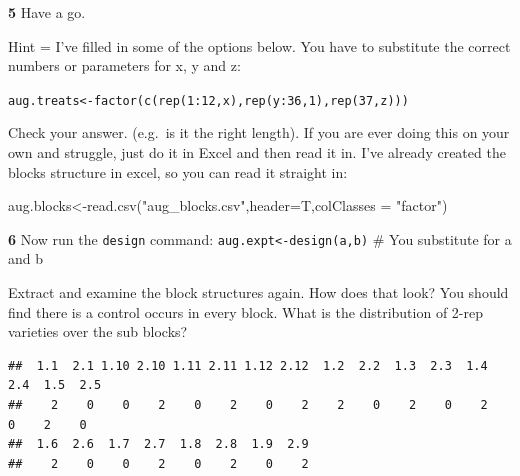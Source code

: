\documentclass[
]{book}
\makeatletter
\newenvironment{Shaded}{\begin{snugshade}}{\end{snugshade}}
\newcommand{\AttributeTok}[1]{\textcolor[rgb]{0.77,0.63,0.00}{#1}}
\newcommand{\DecValTok}[1]{\textcolor[rgb]{0.00,0.00,0.81}{#1}}
\newcommand{\FunctionTok}[1]{\textcolor[rgb]{0.00,0.00,0.00}{#1}}
\newcommand{\NormalTok}[1]{#1}
\newcommand{\OtherTok}[1]{\textcolor[rgb]{0.56,0.35,0.01}{#1}}
\newcommand{\SpecialCharTok}[1]{\textcolor[rgb]{0.00,0.00,0.00}{#1}}
\newcommand{\StringTok}[1]{\textcolor[rgb]{0.31,0.60,0.02}{#1}}
\newenvironment{kframe}{%
\medskip{}
\setlength{\fboxsep}{.8em}
 \def\at@end@of@kframe{}%
 \ifinner\ifhmode%
  \def\at@end@of@kframe{\end{minipage}}%
  \begin{minipage}{\columnwidth}%
 \fi\fi%
 \def\FrameCommand##1{\hskip\@totalleftmargin \hskip-\fboxsep
 \colorbox{shadecolor}{##1}\hskip-\fboxsep
     \hskip-\linewidth \hskip-\@totalleftmargin \hskip\columnwidth}%
 \MakeFramed {\advance\hsize-\width
   \@totalleftmargin\z@ \linewidth\hsize
   \@setminipage}}%
 {\par\unskip\endMakeFramed%
 \at@end@of@kframe}
\newenvironment{rmdblock}[1]
  {
  \begin{itemize}
  \renewcommand{\labelitemi}{
    \raisebox{-.7\height}[0pt][0pt]{
      {\setkeys{Gin}{width=3em,keepaspectratio}\texttt{[image: images/\#1]}}
    }
  }
  \setlength{\fboxsep}{1em}
  \begin{kframe}
  \item
  }
  {
  \end{kframe}
  \end{itemize}
  }
\newenvironment{rmdquiz}
  {\begin{rmdblock}{quiz}}
  {\end{rmdblock}}
\makeatother
\begin{document}
\begin{rmdquiz}
\textbf{5} Have a go.

Hint = I've filled in some of the options below. You have to substitute the correct numbers or parameters for x, y and z:

\texttt{aug.treats\textless{}-factor(c(rep(1:12,x),rep(y:36,1),rep(37,z)))}
\end{rmdquiz}

Check your answer. (e.g.~is it the right length). If you are ever doing this on your own and struggle, just do it in Excel and then read it in. I've already created the blocks structure in excel, so you can read it straight in:

\begin{Shaded}
\begin{Highlighting}[]
\NormalTok{aug.blocks}\OtherTok{\textless{}{-}}\FunctionTok{read.csv}\NormalTok{(}\StringTok{"aug\_blocks.csv"}\NormalTok{,}\AttributeTok{header=}\NormalTok{T,}\AttributeTok{colClasses =} \StringTok{"factor"}\NormalTok{)}
\end{Highlighting}
\end{Shaded}

\begin{rmdquiz}
\textbf{6} Now run the \texttt{design} command:
\texttt{aug.expt\textless{}-design(a,b)} \# You substitute for a and b
\end{rmdquiz}

Extract and examine the block structures again. How does that look?
You should find there is a control occurs in every block. What is the distribution of 2-rep varieties over the sub blocks?

\begin{Shaded}
\end{Shaded}

\begin{verbatim}
##  1.1  2.1 1.10 2.10 1.11 2.11 1.12 2.12  1.2  2.2  1.3  2.3  1.4  2.4  1.5  2.5 
##    2    0    0    2    0    2    0    2    2    0    2    0    2    0    2    0 
##  1.6  2.6  1.7  2.7  1.8  2.8  1.9  2.9 
##    2    0    0    2    0    2    0    2
\end{verbatim}
\end{document}
